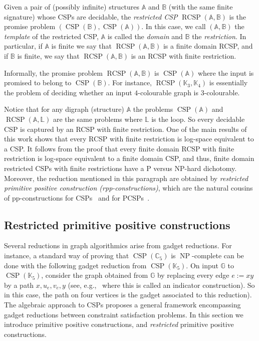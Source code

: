 \documentclass{article}
\theoremstyle{definition}
\theoremstyle{remark}
\DeclareMathOperator{\NP}{NP}
\DeclareMathOperator{\CSP}{CSP}
\DeclareMathOperator{\RCSP}{RCSP}
\newcommand{\bA}{{\mathbb A}}
\newcommand{\bB}{{\mathbb B}}
\newcommand{\bC}{{\mathbb C}}
\newcommand{\bG}{{\mathbb G}}
\newcommand{\bK}{{\mathbb K}}
\newcommand{\bL}{{\mathbb L}}
\begin{document}
Given a pair of (possibly infinite) structures $\bA$ and $\bB$ (with the same finite signature) whose
CSPs are decidable, the \emph{restricted CSP} $\RCSP(\bA,\bB)$ is the promise problem $(\CSP(\bB),\CSP(\bA))$.
In this case, we call $(\bA,\bB)$ the \emph{template} of the restricted CSP, $\bA$ is called the \emph{domain}
and $\bB$ the \emph{restriction}. In particular, if $\bA$ is finite we say that $\RCSP(\bA,\bB)$ is
a finite domain RCSP, and if $\bB$ is finite, we say that $\RCSP(\bA,\bB)$ is an RCSP with finite restriction.

Informally, the promise problem $\RCSP(\bA,\bB)$ is $\CSP(\bA)$ where the input is promised to belong to
$\CSP(\bB)$.  For instance, $\RCSP(\bK_3,\bK_4)$ is essentially the problem of deciding whether an input
$4$-colourable graph is $3$-colourable.

Notice that for any digraph (structure) $\bA$ the problems $\CSP(\bA)$ and $\RCSP(\bA,\bL)$ are the same
problems where $\bL$ is the loop. So every decidable CSP is captured by an RCSP with finite restriction. 
One of the main results of this work shows that every RCSP with finite restriction is log-space equivalent
to a CSP. It follows from the proof that every finite domain RCSP with finite restriction is log-space equivalent
to a finite domain CSP, and thus, finite domain restricted CSPs with finite restrictions have a P versus NP-hard
dichotomy. Moreover, the reduction mentioned in this paragraph are obtained by \emph{restricted primitive positive
construction (rpp-constructions)}, which are the natural cousins of pp-constructions for CSPs~\cite{wonderland} and
for PCSPs~\cite{BartoBKO21}.


\subsection{Restricted primitive positive constructions}

Several reductions in graph algorithmics arise from gadget reductions. For instance, 
a standard way of proving that $\CSP(\bC_5)$ is $\NP$-complete can be done with the
following gadget reduction from $\CSP(\bK_5)$. On input $\bG$ to $\CSP(\bK_5)$,
consider the graph obtained from $\bG$ by replacing every edge $e:=xy$ by a path
$x,u_e,v_e,y$ (see, e.g.,~\cite{HellNesetril} where this is called an indicator construction). So in this case, the path on four vertices
is the gadget associated to this reduction). 
The algebraic approach to CSPs proposes a general framework encompassing gadget
reductions between constraint satisfaction problems. In this section we introduce
primitive positive constructions, and \emph{restricted} primitive positive constructions. 
\end{document}
